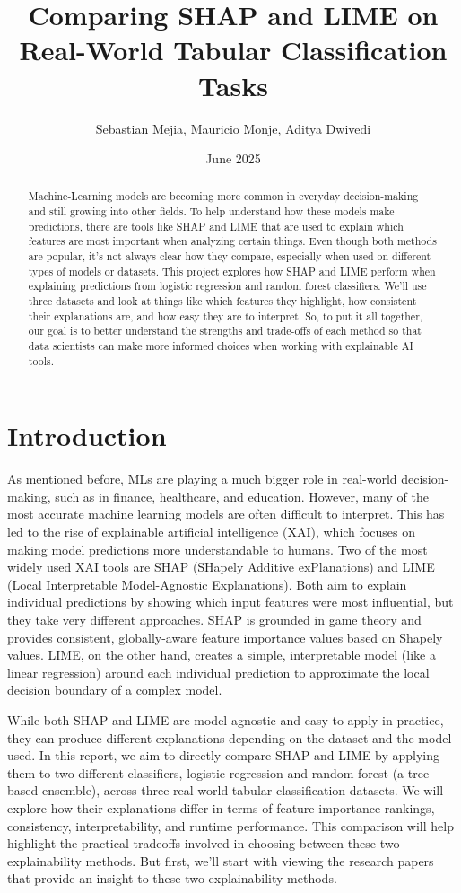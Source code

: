 \documentclass{article}
\title{Comparing SHAP and LIME on Real-World Tabular Classification Tasks}
\author{Sebastian Mejia, Mauricio Monje, Aditya Dwivedi}
\date{June 2025}
\begin{document}
\maketitle

\begin{abstract}
    Machine-Learning models are becoming more common in everyday decision-making and still growing into other fields. To help understand how these models make predictions, there are tools like SHAP and LIME that are used to explain which features are most important when analyzing certain things. Even though both methods are popular, it's not always clear how they compare, especially when used on different types of models or datasets. This project explores how SHAP and LIME perform when explaining predictions from logistic regression and random forest classifiers. We'll use three datasets and look at things like which features they highlight, how consistent their explanations are, and how easy they are to interpret. So, to put it all together, our goal is to better understand the strengths and trade-offs of each method so that data scientists can make more informed choices when working with explainable AI tools. 
\end{abstract}

\section{Introduction}
As mentioned before, MLs are playing a much bigger role in real-world decision-making, such as in finance, healthcare, and education. However, many of the most accurate machine learning models are often difficult to interpret. This has led to the rise of explainable artificial intelligence (XAI), which focuses on making model predictions more understandable to humans. Two of the most widely used XAI tools are SHAP (SHapely Additive exPlanations) and LIME (Local Interpretable Model-Agnostic Explanations). Both aim to explain individual predictions by showing which input features were most influential, but they take very different approaches. SHAP is grounded in game theory and provides consistent, globally-aware feature importance values based on Shapely values. LIME, on the other hand, creates a simple, interpretable model (like a linear regression) around each individual prediction to approximate the local decision boundary of a complex model.

While both SHAP and LIME are model-agnostic and easy to apply in practice, they can produce different explanations depending on the dataset and the model used. In this report, we aim to directly compare SHAP and LIME by applying them to two different classifiers, logistic regression and random forest (a tree-based ensemble), across three real-world tabular classification datasets. We will explore how their explanations differ in terms of feature importance rankings, consistency, interpretability, and runtime performance. This comparison will help highlight the practical tradeoffs involved in choosing between these two explainability methods. But first, we'll start with viewing the research papers that provide an insight to these two explainability methods.
\end{document}

